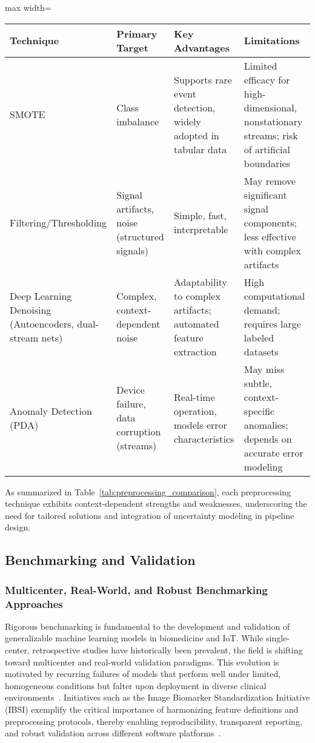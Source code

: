 \begin{table*}[htbp]
\centering
\caption{Comparison of Preprocessing Techniques for Biomedical and IoT Data}
\label{tab:preprocessing_comparison}
\begin{adjustbox}{max width=\textwidth}
\begin{tabular}{llll}
\toprule
\textbf{Technique} & \textbf{Primary Target} & \textbf{Key Advantages} & \textbf{Limitations} \\
\midrule
SMOTE & Class imbalance & Supports rare event detection, widely adopted in tabular data & Limited efficacy for high-dimensional, nonstationary streams; risk of artificial boundaries\\
Filtering/Thresholding & Signal artifacts, noise (structured signals) & Simple, fast, interpretable & May remove significant signal components; less effective with complex artifacts\\
Deep Learning Denoising (Autoencoders, dual-stream nets) & Complex, context-dependent noise & Adaptability to complex artifacts; automated feature extraction & High computational demand; requires large labeled datasets\\
Anomaly Detection (PDA) & Device failure, data corruption (streams) & Real-time operation, models error characteristics & May miss subtle, context-specific anomalies; depends on accurate error modeling\\
\bottomrule
\end{tabular}
\end{adjustbox}
\end{table*}

As summarized in Table~\ref{tab:preprocessing_comparison}, each preprocessing technique exhibits context-dependent strengths and weaknesses, underscoring the need for tailored solutions and integration of uncertainty modeling in pipeline design.

\subsection{Benchmarking and Validation}

\subsubsection{Multicenter, Real-World, and Robust Benchmarking Approaches}

Rigorous benchmarking is fundamental to the development and validation of generalizable machine learning models in biomedicine and IoT. While single-center, retrospective studies have historically been prevalent, the field is shifting toward multicenter and real-world validation paradigms. This evolution is motivated by recurring failures of models that perform well under limited, homogeneous conditions but falter upon deployment in diverse clinical environments~\cite{ref31,ref33,ref44}. Initiatives such as the Image Biomarker Standardization Initiative (IBSI) exemplify the critical importance of harmonizing feature definitions and preprocessing protocols, thereby enabling reproducibility, transparent reporting, and robust validation across different software platforms~\cite{ref49,ref50,ref54}.

